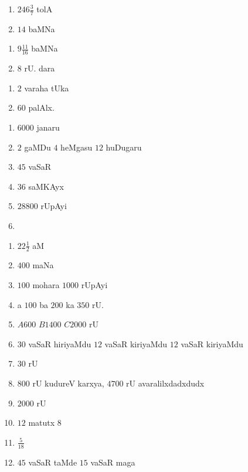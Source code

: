 \newpage
{}

\begin{multicols}{2}
\begin{enumerate}[$(1)$]
\item $246 \frac{3}{7}$ tolA
\item $14$ baMNa
\end{enumerate}
\end{multicols}


\begin{multicols}{2}
\begin{enumerate}[$(1)$]
\item $9 \frac{11}{16}$ baMNa
\item $8$ rU. dara
\end{enumerate}
\end{multicols}


\begin{multicols}{2}
\begin{enumerate}[$(1)$]
\item $2$ varaha tUka
\item $60$ palAlx.
\end{enumerate}
\end{multicols}


\begin{multicols}{2}
\begin{enumerate}[$(1)$]
\item $6000$ janaru
\item $2$ gaMDu $4$ heMgasu $12$ huDugaru
\item $45$ vaSaR
\item $36$ saMKAyx
\item $28800$ rUpAyi
\item[]
\end{enumerate}
\end{multicols}


\begin{multicols}{2}
\begin{enumerate}[$(1)$]
\item $22\frac{1}{2}$ aM
\item $400$ maNa
\item $100$ mohara $1000$ rUpAyi
\item a $100$ ba $200$ ka $350$ rU.
\item $A 600$ $B 1400$ $C2000$ rU
\item $30$ vaSaR hiriyaMdu $12$ vaSaR kiriyaMdu $12$ vaSaR kiriyaMdu
\item $30$ rU
\item $800$ rU kudureV karxya, $4700$ rU avaralilxdadxdudx
\item $2000$ rU
\item $12$ matutx $8$ 
\item $\frac{5}{18}$ 
\item $45$ vaSaR taMde $15$ vaSaR maga
\end{enumerate}
\end{multicols}

